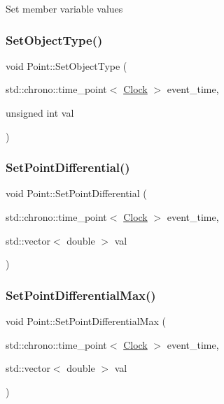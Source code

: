 Set member variable values \mbox{\label{classPoint_a3afeb2d7a2e2b7d9406a57fefa1af2ee}} 
\subsubsection{\texorpdfstring{Set\+Object\+Type()}{SetObjectType()}}
{\footnotesize\ttfamily void Point\+::\+Set\+Object\+Type (\begin{DoxyParamCaption}\item[{std\+::chrono\+::time\+\_\+point$<$ \mbox{\hyperlink{universe_8h_a0ef8d951d1ca5ab3cfaf7ab4c7a6fd80}{Clock}} $>$}]{event\+\_\+time,  }\item[{unsigned int}]{val }\end{DoxyParamCaption})}

\mbox{\label{classPoint_adb977a2f01e7a2b549e1bd36fa6f5354}} 
\subsubsection{\texorpdfstring{Set\+Point\+Differential()}{SetPointDifferential()}}
{\footnotesize\ttfamily void Point\+::\+Set\+Point\+Differential (\begin{DoxyParamCaption}\item[{std\+::chrono\+::time\+\_\+point$<$ \mbox{\hyperlink{universe_8h_a0ef8d951d1ca5ab3cfaf7ab4c7a6fd80}{Clock}} $>$}]{event\+\_\+time,  }\item[{std\+::vector$<$ double $>$}]{val }\end{DoxyParamCaption})\hspace{0.3cm}{\ttfamily [inline]}}

\mbox{\label{classPoint_ac2e53da4cbee0dc39c0b7a4d3e3a6ee5}} 
\subsubsection{\texorpdfstring{Set\+Point\+Differential\+Max()}{SetPointDifferentialMax()}}
{\footnotesize\ttfamily void Point\+::\+Set\+Point\+Differential\+Max (\begin{DoxyParamCaption}\item[{std\+::chrono\+::time\+\_\+point$<$ \mbox{\hyperlink{universe_8h_a0ef8d951d1ca5ab3cfaf7ab4c7a6fd80}{Clock}} $>$}]{event\+\_\+time,  }\item[{std\+::vector$<$ double $>$}]{val }\end{DoxyParamCaption})\hspace{0.3cm}{\ttfamily [inline]}}

